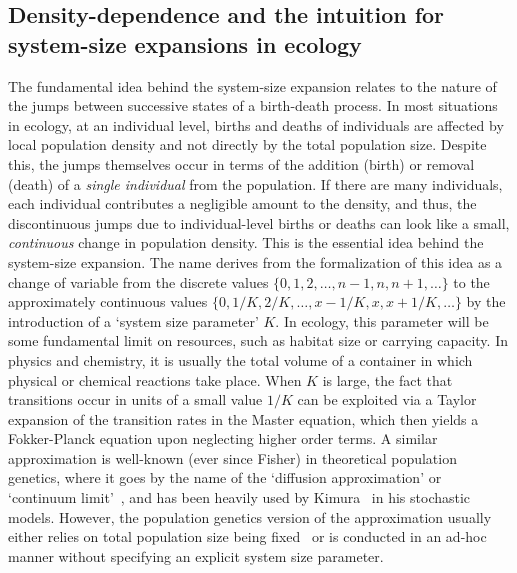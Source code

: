 \subsection{Density-dependence and the intuition for system-size expansions in ecology}
The fundamental idea behind the system-size expansion relates to the nature of the jumps between successive states of a birth-death process. In most situations in ecology, at an individual level, births and deaths of individuals are affected by local population density and not directly by the total population size. Despite this, the jumps themselves occur in terms of the addition (birth) or removal (death) of a \emph{single individual} from the population. If there are many individuals, each individual contributes a negligible amount to the density, and thus, the discontinuous jumps due to individual-level births or deaths can look like a small, \emph{continuous} change in population density. This is the essential idea behind the system-size expansion. The name derives from the formalization of this idea as a change of variable from the discrete values $\{0,1,2,\ldots,n-1,n,n+1,\ldots\}$ to the approximately continuous values $\{0,1/K,2/K,\dots,x-1/K,x,x+1/K,\ldots\}$ by the introduction of a `system size parameter' $K$. In ecology, this parameter will be some fundamental limit on resources, such as habitat size or carrying capacity. In physics and chemistry, it is usually the total volume of a container in which physical or chemical reactions take place. When $K$ is large, the fact that transitions occur in units of a small value $1/K$ can be exploited via a Taylor expansion of the transition rates in the Master equation, which then yields a Fokker-Planck equation upon neglecting higher order terms. A similar approximation is well-known (ever since Fisher) in theoretical population genetics, where it goes by the name of the `diffusion approximation'\citep{ewens_mathematical_2004} or `continuum limit'~\citep{czuppon_understanding_2021}, and has been heavily used by Kimura~\citep{crow_introduction_1970} in his stochastic models. However, the population genetics version of the approximation usually either relies on total population size being fixed~\citep{crow_introduction_1970, lande_natural_1976,ewens_mathematical_2004} or is conducted in an ad-hoc manner without specifying an explicit system size parameter.

